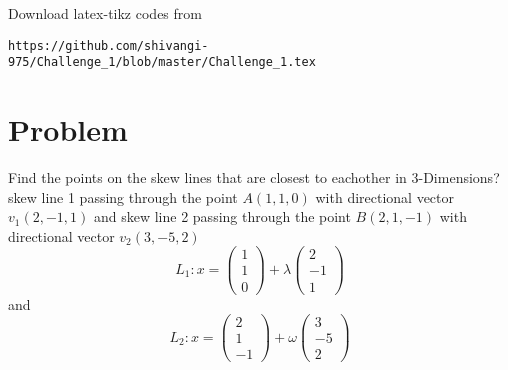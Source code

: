 \documentclass[journal,12pt,twocolumn]{IEEEtran}
\begin{document}
Download latex-tikz codes from 
%
\begin{lstlisting}
https://github.com/shivangi-975/Challenge_1/blob/master/Challenge_1.tex
\end{lstlisting}
%
\section{Problem}
Find the points on the skew lines that are closest to eachother in 3-Dimensions?
 skew line 1 passing through the point \(A(1,1,0)\) with directional vector \(v_1(2,-1,1)\) and skew line 2 passing through the point \(B(2,1,-1)\)  with directional vector \(v_2(3,-5,2)\)
%
%
\begin{equation}
	L_1 : x = 
\begin{pmatrix}
	1 \\
	1 \\
	0
\end{pmatrix}
	+ \lambda
\begin{pmatrix}
	2 \\
	-1 \\
	1
\end{pmatrix}
	\label{eq1}
\end{equation}
and
\begin{equation}
	L_2 : x = 
\begin{pmatrix}
	2\\
	1 \\
	-1
\end{pmatrix}
	+ \omega
\begin{pmatrix}
	3 \\
	-5 \\
	2
\end{pmatrix}
	\label{eq2}
\end{equation}
\end{document}
